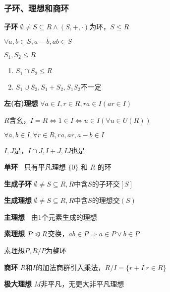 \documentclass[b4paper, 10pt]{ctexart}
\newcommand*{\impl}{\Rightarrow}
\renewcommand*{\iff}{\Leftrightarrow}
\renewcommand*{\leq}{\leqslant}
\newcommand*{\nmsubgroupeq}{\trianglelefteqslant}
\newcommand*{\genring}[1]{[#1]}
\newcommand*{\genideal}[1]{(#1)}
\begin{document}
\begin{multicols}{3}
    \subsubsection{子环、理想和商环}

    \textbf{子环} $\emptyset \!\neq\! S \!\subseteq\! R \wedge (S, +, \cdot)$为环，$S \leq R$

    \begin{theorem}[子环判则]
        $\forall a, b \in S, a - b, ab \in S$
    \end{theorem}

    \begin{theorem}[子环运算律]
        $S_1, S_2 \leq R$
        \begin{enumerate}
            \item $S_1 \cap S_2 \leq R$
            \item $S_1 \cup S_2, S_1 + S_2, S_1S_2$不一定
        \end{enumerate}
    \end{theorem}

    \textbf{左(右)理想} $\forall a \in I, r \in R, ra \in I (ar \in I)$

    $R$含幺，$I \! = \! R \iff 1 \!\in\! I \iff u \!\in\! I (\forall u \!\in\! U(R))$

    \begin{theorem}[理想判则]
        $\forall a, b \!\in\! I, \forall r \!\in\! R, ra, ar, a-b \in I$
    \end{theorem}

    \begin{theorem}[理想运算律]
        $I, J$是，$I \cap J, I + J, IJ$也是
    \end{theorem}

    \textbf{单环\ } 只有平凡理想 $\{0\}$ 和 $R$ 的环

    \textbf{生成子环} $\emptyset \!\neq\! S \!\subseteq\! R, R$中含$\!S\!$的子环交$\genring{S}$

    \textbf{生成理想} $\emptyset \!\neq\! S \!\subseteq\! R, R$中含$\!S\!$的理想交$\genideal{S}$

    \textbf{主理想\ } 由1个元素生成的理想

    \textbf{素理想} $P \nmsubgroupeq R$交换，$ab \in P \impl a \in P \vee b \in P$

    素理想$P, R/P$为整环

    \textbf{商环} $R$和$I$的加法商群引入乘法，$R/I=\{r+I|r\in R\}$

    \textbf{极大理想} $M$非平凡，无更大非平凡理想


\end{multicols}
\end{document}
